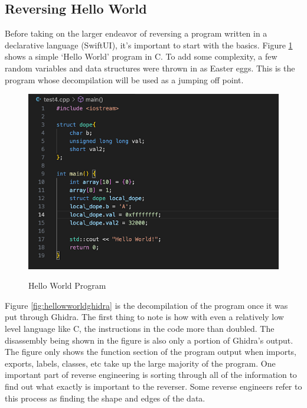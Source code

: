\subsection{Reversing Hello World}
Before taking on the larger endeavor of reversing a program written in a declarative language (SwiftUI), it’s important to start with the basics. 
Figure \ref{fig:helloworldsource} shows a simple ‘Hello World’ program in C. 
To add some complexity, a few random variables and data structures were thrown in as Easter eggs. 
This is the program whose decompilation will be used as a jumping off point.
\begin{figure}[h]
	\caption{Hello World Program}
	\includegraphics[scale=.75]{HelloWorldSource.png}
        \label{fig:helloworldsource}
\end{figure}
Figure \ref{fig:hellowworldghidra} is the decompilation of the program once it was put through Ghidra. 
The first thing to note is how with even a relatively low level language like C, the instructions in the code more than doubled. 
The disassembly being shown in the figure is also only a portion of Ghidra’s output. 
The figure only shows the function section of the program output when imports, exports, labels, classes, etc take up the large majority of the program. 
One important part of reverse engineering is sorting through all of the information to find out what exactly is important to the reverser. 
Some reverse engineers refer to this process as finding the shape and edges of the data. 
